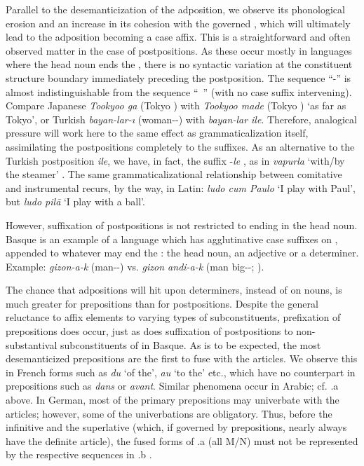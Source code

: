 Parallel to the desemanticization of the adposition, we observe its phonological erosion and an increase in its cohesion with the governed \np, which will ultimately lead to the adposition becoming a case affix. This is a straightforward and often observed matter in the case of postpositions. As these occur mostly in languages where the head noun ends the \np, there is no syntactic variation at the constituent structure boundary immediately preceding the postposition. The sequence ``\np-\case'' is almost indistinguishable from the sequence ``\np~\postp'' (with no case suffix intervening). Compare Japanese \textit{Tookyoo ga} (Tokyo \glnom) with \textit{Tookyoo made} (Tokyo \term) `as far as Tokyo', or Turkish \textit{bayan-lar-ı} (woman-\glpl-\glacc) with \textit{bayan-lar ile}. Therefore, analogical pressure will work here to the same effect as grammaticalization itself, assimilating the postpositions completely to the suffixes.\label{page89} As an alternative to the Turkish postposition \textit{ile}, we have, in fact, the suffix -\textit{le} \inst, as in \textit{vapurla} ‘with/by the steamer’ \citep[63]{Wendt1972}. The same grammaticalizational relationship between comitative and instrumental recurs, by the way, in Latin: \textit{ludo cum Paulo} ‘I play with Paul’, but \textit{ludo pil\=a} ‘I play with a ball’.

However, suffixation of postpositions is not restricted to \nps ending in the head noun. Basque is an example of a language which has agglutinative case suffixes on \nps, appended to whatever may end the \np: the head noun, an adjective or a determiner. Example: \textit{gizon-a-k} (man-\gldef-\glerg) vs. \textit{gizon andi-a-k} (man big-\gldef-\glerg; \citealt[69]{Brettschneider1978}).

The chance that adpositions will hit upon determiners, instead of on nouns, is much greater for prepositions than for postpositions. Despite the general reluctance to affix elements to varying types of subconstituents, prefixation of prepositions does occur, just as does suffixation of postpositions to non-substantival subconstituents of \nps in Basque. As is to be expected, the most desemanticized prepositions are the first to fuse with the articles. We observe this in French forms such as \textit{du} ‘of the’, \textit{au} ‘to the’ etc., which have no counterpart in prepositions such as \textit{dans} or \textit{avant}. Similar phenomena occur in Arabic; cf. .a above. In German, most of the primary prepositions may univerbate with the articles; however, some of the univerbations are obligatory. Thus, before the infinitive and the superlative (which, if governed by prepositions, nearly always have the definite article), the fused forms of .a (all M/N) must not be represented by the respective sequences in .b \citep[36]{Vater1979}.

